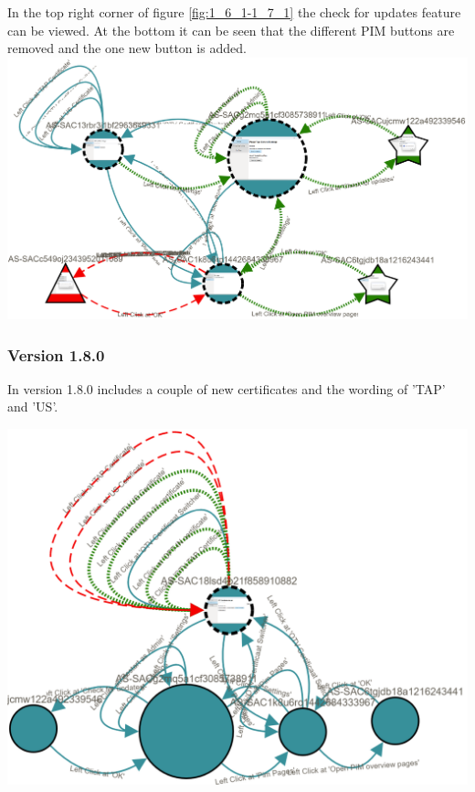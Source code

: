 In the top right corner of figure \ref{fig:1_6_1-1_7_1} the check for updates feature can be viewed. At the bottom it can be seen that the different PIM buttons are removed and the one new button is added. 
\\
\begingroup
\captionsetup{type=figure}
\includegraphics[scale=0.4]{images/6-Experiment/1_6_1-1_7_1.png}
\label{fig:1_6_1-1_7_1}
\endgroup

\subsubsection{Version 1.8.0}
In version 1.8.0 includes a couple of new certificates and the wording of 'TAP' and 'US'. 

\begingroup
\captionsetup{type=figure}
\includegraphics[scale=0.5]{images/6-Experiment/1_7_1-1_8_0.png}
\label{fig:1_7_1-1_8_0}
\endgroup

